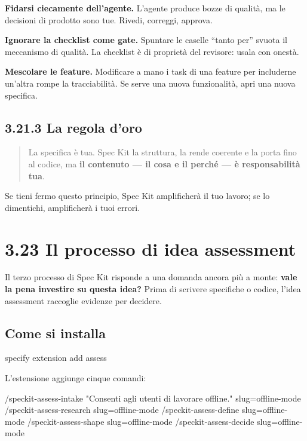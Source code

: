 \documentclass[
  italian,
  10pt,
]{book}
\newenvironment{Shaded}{\begin{snugshade}}{\end{snugshade}}
\newcommand{\ExtensionTok}[1]{#1}
\newcommand{\NormalTok}[1]{#1}
\begin{document}
\textbf{Fidarsi ciecamente dell'agente.} L'agente produce bozze di
qualità, ma le decisioni di prodotto sono tue. Rivedi, correggi,
approva.

\textbf{Ignorare la checklist come gate.} Spuntare le caselle ``tanto
per'' svuota il meccanismo di qualità. La checklist è di proprietà del
revisore: usala con onestà.

\textbf{Mescolare le feature.} Modificare a mano i task di una feature
per includerne un'altra rompe la tracciabilità. Se serve una nuova
funzionalità, apri una nuova specifica.

\subsection{3.21.3 La regola d'oro}\label{la-regola-doro}

\begin{quote}
La specifica è tua. Spec Kit la struttura, la rende coerente e la porta
fino al codice, ma \textbf{il contenuto --- il cosa e il perché --- è
responsabilità tua}.
\end{quote}

Se tieni fermo questo principio, Spec Kit amplificherà il tuo lavoro; se
lo dimentichi, amplificherà i tuoi errori.

\section{3.23 Il processo di idea
assessment}\label{il-processo-di-idea-assessment}

Il terzo processo di Spec Kit risponde a una domanda ancora più a monte:
\textbf{vale la pena investire su questa idea?} Prima di scrivere
specifiche o codice, l'idea assessment raccoglie evidenze per decidere.

\subsection{Come si installa}\label{come-si-installa-1}

\begin{Shaded}
\begin{Highlighting}[]
\ExtensionTok{specify}\NormalTok{ extension add assess}
\end{Highlighting}
\end{Shaded}

L'estensione aggiunge cinque comandi:

\begin{Shaded}
\begin{Highlighting}[]
\NormalTok{/speckit{-}assess{-}intake  "Consenti agli utenti di lavorare offline." slug=offline{-}mode}
\NormalTok{/speckit{-}assess{-}research slug=offline{-}mode}
\NormalTok{/speckit{-}assess{-}define  slug=offline{-}mode}
\NormalTok{/speckit{-}assess{-}shape   slug=offline{-}mode}
\NormalTok{/speckit{-}assess{-}decide  slug=offline{-}mode}
\end{Highlighting}
\end{Shaded}
\end{document}
